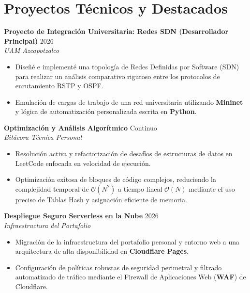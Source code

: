 \documentclass[10pt,a4paper]{article}
\begin{document}
\section{Proyectos Técnicos y Destacados}
\noindent
\textbf{Proyecto de Integración Universitaria: Redes SDN (Desarrollador Principal)} \hfill 2026 \\
\textit{UAM Azcapotzalco} \\
\begin{itemize}
    \item Diseñé e implementé una topología de Redes Definidas por Software (SDN) para realizar un análisis comparativo riguroso entre los protocolos de enrutamiento RSTP y OSPF.
    \item Emulación de cargas de trabajo de una red universitaria utilizando \textbf{Mininet} y lógica de automatización personalizada escrita en \textbf{Python}.
\end{itemize}

\vspace{6pt}
\noindent
\textbf{Optimización y Análisis Algorítmico} \hfill Continuo \\
\textit{Bitácora Técnica Personal} \\
\begin{itemize}
    \item Resolución activa y refactorización de desafíos de estructuras de datos en LeetCode enfocada en velocidad de ejecución.
    \item Optimización exitosa de bloques de código complejos, reduciendo la complejidad temporal de $\mathcal{O}(N^2)$ a tiempo lineal $\mathcal{O}(N)$ mediante el uso preciso de Tablas Hash y asignación eficiente de memoria.
\end{itemize}

\vspace{6pt}
\noindent
\textbf{Despliegue Seguro Serverless en la Nube} \hfill 2026 \\
\textit{Infraestructura del Portafolio} \\
\begin{itemize}
    \item Migración de la infraestructura del portafolio personal y entorno web a una arquitectura de alta disponibilidad en \textbf{Cloudflare Pages}.
    \item Configuración de políticas robustas de seguridad perimetral y filtrado automatizado de tráfico mediante el Firewall de Aplicaciones Web (\textbf{WAF}) de Cloudflare.
\end{itemize}
\end{document}
